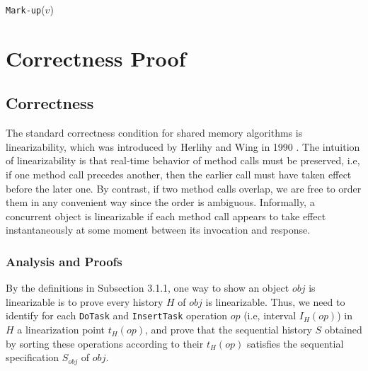 \begin{algorithm}
\caption{\texttt{Mark-up}($v$)}
\end{algorithm}



%

\chapter{Correctness Proof}
\section{Correctness}
The standard correctness condition for shared memory algorithms is linearizability, which was introduced by Herlihy and Wing in 1990 \cite{Herlihy:1990:LCC:78969.78972}. The intuition of linearizability is that real-time behavior of method calls must be preserved, i.e, if one method call precedes another, then the earlier call must have taken effect before the later one. By contrast, if two method calls overlap, we are free to order them in any convenient way since the order is ambiguous. Informally, a concurrent object is linearizable if each method call appears to take effect instantaneously at some moment between its invocation and response.

\subsection{Analysis and Proofs}

By the definitions in Subsection 3.1.1, one way to show an object $obj$ is linearizable is to prove every history $H$ of $obj$ is linearizable. Thus, we need to identify for each \texttt{DoTask} and \texttt{InsertTask} operation $op$ (i.e, interval $I_H(op)$) in $H$ a linearization point $t_H(op)$, and prove that the sequential history $S$ obtained by sorting these operations according to their $t_H(op)$ satisfies the sequential specification  $S_{obj}$  of $obj$.


